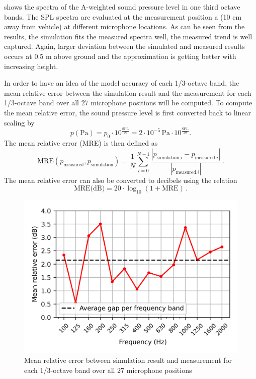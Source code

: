\noindent{} shows the spectra of the A-weighted sound pressure level in one third octave bands. The SPL spectra are evaluated at the measurement position a (10 cm away from vehicle) at different microphone locations. As can be seen from the results, the simulation fits the measured spectra well, the measured trend is well captured. Again, larger deviation between the simulated and measured results occurs at 0.5 m above ground and the approximation is getting better with increasing height.

In order to have an idea of the model accuracy of each 1/3-octave band, the mean relative error between the simulation result and the measurement for each 1/3-octave band over all 27 microphone positions will be computed. To compute the mean relative error, the sound pressure level is first converted back to linear scaling by
\begin{equation}
	p(\text{Pa}) = p_0 \cdot 10^{\frac{\text{SPL}}{20}} = 2\cdot10^{-5}\,\text{Pa} \cdot 10^{\frac{\text{SPL}}{20}}\text{.}
\end{equation}
The mean relative error (MRE) is then defined as
\begin{equation}
	\text{MRE}(p_{\text{measured}}, p_{\text{simulation}}) = \frac{1}{N} \sum_{i=0}^{N - 1} \frac{|p_{\text{simulation,}i} - p_{\text{measured,}i}|}{|p_{\text{measured,}i}|}\,.
\end{equation}
The mean relative error can also be converted to decibels using the relation
\begin{equation}
	\text{MRE(dB)} = 20\cdot\log_{10}(1 + \text{MRE})\,.
\end{equation}

\begin{figure}[H]
	\centering
	\includegraphics{fig/chap5/initial_model/freq_spectrum/average_gap.png}
	\caption{Mean relative error between simulation result and measurement for each 1/3-octave band over all 27 microphone positions}
	\label{fig:gap_freq_spectrum}
\end{figure}

